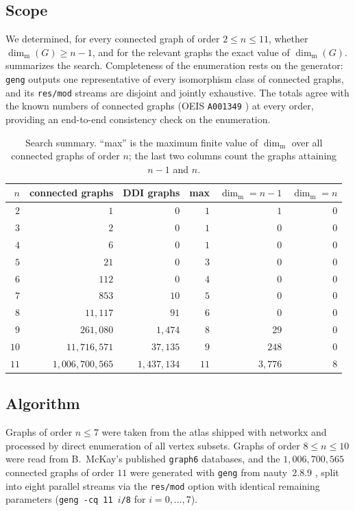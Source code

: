 \documentclass[11pt]{amsart}
\theoremstyle{remark}
\newcommand{\mdim}{\operatorname{dim}_{\mathrm m}}
\begin{document}
\subsection{Scope}
We determined, for every connected graph of order $2\le n\le 11$, whether $\mdim(G)\ge n-1$, and for the relevant graphs the exact value of $\mdim(G)$.   summarizes the search.  Completeness of the enumeration rests on the generator: \texttt{geng} outputs one representative of every isomorphism class of connected graphs, and its \texttt{res/mod} streams are disjoint and jointly exhaustive.  The totals agree with the known numbers of connected graphs (OEIS \texttt{A001349} \cite{OEIS-A001349}) at every order, providing an end-to-end consistency check on the enumeration.

\begin{table}[ht]
\centering
\caption{Search summary.  ``max'' is the maximum finite value of $\mdim$ over all connected graphs of order $n$; the last two columns count the graphs attaining $n-1$ and $n$.}\label{tab:scan}
\small
\begin{tabular}{rrrrrr}
\toprule
$n$ & connected graphs & DDI graphs & max & $\mdim=n-1$ & $\mdim=n$\\
\midrule
$2$ & $1$ & $0$ & $1$ & $1$ & $0$\\
$3$ & $2$ & $0$ & $1$ & $0$ & $0$\\
$4$ & $6$ & $0$ & $1$ & $0$ & $0$\\
$5$ & $21$ & $0$ & $3$ & $0$ & $0$\\
$6$ & $112$ & $0$ & $4$ & $0$ & $0$\\
$7$ & $853$ & $10$ & $5$ & $0$ & $0$\\
$8$ & $11{,}117$ & $91$ & $6$ & $0$ & $0$\\
$9$ & $261{,}080$ & $1{,}474$ & $8$ & $29$ & $0$\\
$10$ & $11{,}716{,}571$ & $37{,}135$ & $9$ & $248$ & $0$\\
$11$ & $1{,}006{,}700{,}565$ & $1{,}437{,}134$ & $11$ & $3{,}776$ & $8$\\
\bottomrule
\end{tabular}
\end{table}

\subsection{Algorithm}
Graphs of order $n\le 7$ were taken from the atlas shipped with \textsf{networkx} and processed by direct enumeration of all vertex subsets.  Graphs of order $8\le n\le 10$ were read from B.~McKay's published \texttt{graph6} databases, and the $1{,}006{,}700{,}565$ connected graphs of order $11$ were generated with \texttt{geng} from \textsf{nauty}~2.8.9 \cite{McKayPiperno2014,NautySoftware}, split into eight parallel streams via the \texttt{res/mod} option with identical remaining parameters (\texttt{geng -cq 11 $i$/8} for $i=0,\dots,7$).
\end{document}
